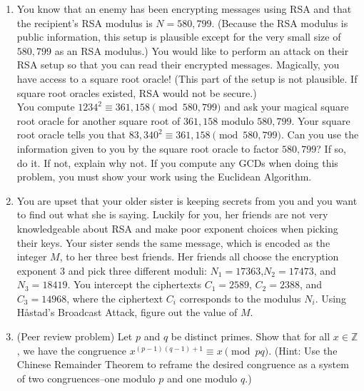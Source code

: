 \documentclass[12pt]{article}
\begin{document}
\begin{enumerate}
\item You know that an enemy has been encrypting messages using RSA and that the recipient's RSA modulus is $N = 580,799$.  (Because the RSA modulus is public information, this setup is plausible except for the very small size of $580,799$ as an RSA modulus.)  You would like to perform an attack on their RSA setup so that you can read their encrypted messages.  Magically, you have access to a square root oracle!  (This part of the setup is not plausible.  If square root oracles existed, RSA would not be secure.)  \\[1em]
You compute $1234^2\equiv 361,158 \pmod{580,799}$ and ask your magical square root oracle for another square root of $361,158 $ modulo $580,799$. Your square root oracle tells you that $83,340^2\equiv 361,158 \pmod{580,799}$.  Can you use the information given to you by the square root oracle to factor $580,799$?  If so, do it.  If not, explain why not.  If you compute any GCDs when doing this problem, you must show your work using the Euclidean Algorithm. \\


\item You are upset that your older sister is keeping secrets from you and you want to find out what she is saying. Luckily for you, her friends are not very knowledgeable about RSA and make poor exponent choices when picking their keys.  Your sister sends the same message, which is encoded as the integer $M$, to her three best friends.  Her friends all choose the encryption exponent $3$ and pick three different moduli: $N_1=17363$,$N_2=17473$, and $N_3=18419$.  You intercept the ciphertexts $C_1=2589$, $C_2=2388$, and $C_3=14968$, where the ciphertext $C_i$ corresponds to the modulus $N_i$.  Using H\r{a}stad's Broadcast Attack, figure out the value of $M$. \\
 
 \item (Peer review problem) Let $p$ and $q$ be distinct primes.  Show that for all $x \in \mathbb{Z}$, we have the congruence $x^{(p-1)(q-1)+1} \equiv x \pmod{pq}$.  (Hint: Use the Chinese Remainder Theorem to reframe the desired congruence as a system of two congruences--one modulo $p$ and one modulo $q$.)
\end{enumerate}
\end{document}
